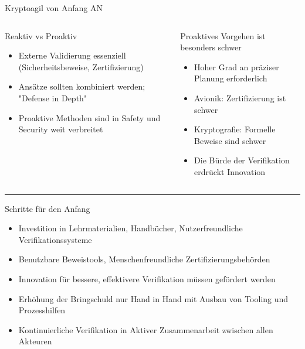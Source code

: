 


\begin{frame}{Kryptoagil von Anfang AN}
  \begin{columns}[t,fullwidth]
    \begin{column}{.3\linewidth}
      Reaktiv vs Proaktiv
      \tiny
      \vspace{0.5em}
      \begin{itemize}
        \item Externe Validierung essenziell (Sicherheitsbeweise, Zertifizierung)
        \item Ansätze sollten kombiniert werden; "Defense in Depth"
        \item Proaktive Methoden sind in Safety und Security weit verbreitet
      \end{itemize}
    \end{column}

    \vrule

    \begin{column}{.65\linewidth}
      Proaktives Vorgehen ist besonders schwer
      \tiny
      \vspace{0.5em}
      \begin{itemize}
        \item Hoher Grad an präziser Planung erforderlich %
        \item Avionik: Zertifizierung ist schwer
        \item Kryptografie: Formelle Beweise sind schwer
        \item Die Bürde der Verifikation erdrückt Innovation
      \end{itemize}
    \end{column}

  \end{columns}

  \hrule

  Schritte für den Anfang

  \tiny
  \begin{itemize}
    \item Investition in Lehrmaterialien, Handbücher, Nutzerfreundliche Verifikationssysteme
    \item Benutzbare Beweistools, Menschenfreundliche Zertifizierungsbehörden
    \item Innovation für bessere, effektivere Verifikation müssen gefördert werden
    \item Erhöhung der Bringschuld nur Hand in Hand mit Ausbau von Tooling und Prozesshilfen
    \item Kontinuierliche Verifikation in Aktiver Zusammenarbeit zwischen allen Akteuren
  \end{itemize}
\end{frame}


